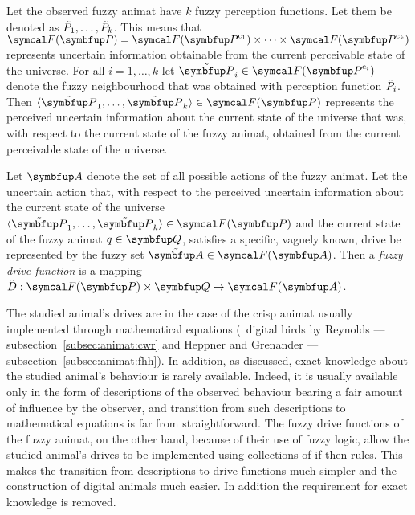 Let the observed fuzzy animat have $k$ fuzzy perception functions. Let them be denoted as $\tilde{P}_1,\ldots,\tilde{P}_k$. This means that $\fpowset{\set{P}}=\fpowset{\set{P}^{\mathrm{c}_1}} \times \cdots \times \fpowset{\set{P}^{\mathrm{c}_k}}$ represents uncertain information obtainable from the current perceivable state of the universe. For all $i=1,\ldots,k$ let $\fset{P}_i \in \fpowset{\set{P}^{\mathrm{c}_i}}$ denote the fuzzy neighbourhood that was obtained with perception function $\tilde{P}_i$. Then $\langle \fset{P}_1,\ldots,\fset{P}_k \rangle \in \fpowset{\set{P}}$ represents the perceived uncertain information about the current state of the universe that was, with respect to the current state of the fuzzy animat, obtained from the current perceivable state of the universe.

\begin{definition}
  \label{def:fuzzyAnimat:Dj}
  Let $\set{A}$ denote the set of all possible actions of the fuzzy animat. Let the uncertain action that, with respect to the perceived uncertain information about the current state of the universe $\langle \fset{P}_1,\ldots,\fset{P}_k \rangle \in \fpowset{\set{P}}$ and the current state of the fuzzy animat $q \in \set{Q}$, satisfies a specific, vaguely known, drive be represented by the fuzzy set $\fset{A} \in \fpowset{\set{A}}$. Then a \emph{fuzzy drive function} is a mapping $\ffunc{D}: \fpowset{\set{P}} \times \set{Q} \mapsto \fpowset{\set{A}}$.
\end{definition}

The studied animal's drives are in the case of the crisp animat  usually implemented through mathematical equations (\eg\ digital birds by Reynolds \cite{reynolds:1987,reynolds:1999}---subsection~\ref{subsec:animat:cwr} and Heppner and Grenander \cite{heppner:1990}---subsection~\ref{subsec:animat:fhh}). In addition, as discussed, exact knowledge about the studied animal's behaviour is rarely available. Indeed, it is usually available only in the form of descriptions of the observed behaviour bearing a fair amount of influence by the observer, and transition from such descriptions to mathematical equations is far from straightforward. The fuzzy drive functions of the fuzzy animat, on the other hand, because of their use of fuzzy logic, allow the studied animal's drives to be implemented using collections of if-then rules. This makes the transition from descriptions to drive functions much simpler and the construction of digital animals much easier. In addition the requirement for exact knowledge is removed.

